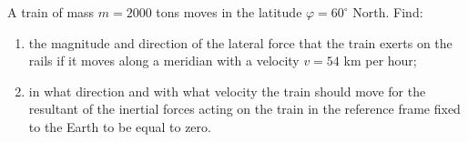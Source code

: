 \item A train of mass \( m = 2000 \) tons moves in the latitude \( \varphi = 60^\circ \) North. Find:
    \begin{enumerate}
        \item the magnitude and direction of the lateral force that the train exerts on the rails if it moves along a meridian with a velocity \( v = 54 \) km per hour;
        \item in what direction and with what velocity the train should move for the resultant of the inertial forces acting on the train in the reference frame fixed to the Earth to be equal to zero.
    \end{enumerate}